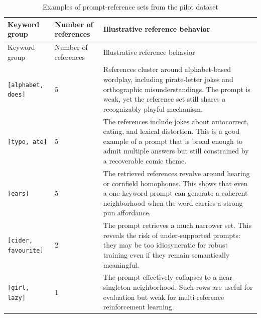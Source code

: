 \documentclass[14pt,a4paper]{extreport}
\begin{document}
\begin{longtable}{p{}p{}p{}}
  \caption{Examples of prompt-reference sets from the pilot dataset}
  \label{tab:examples}                                                                                                                                                                                                                                                       \\
  \toprule
  Keyword group               & Number of references & Illustrative reference behavior                                                                                                                                                                                       \\
  \midrule
  \endfirsthead
  \toprule
  Keyword group               & Number of references & Illustrative reference behavior                                                                                                                                                                                       \\
  \midrule
  \endhead
  \bottomrule
  \endfoot
  \texttt{[alphabet, does]}   & 5                    & References cluster around alphabet-based wordplay, including pirate-letter jokes and orthographic misunderstandings. The prompt is weak, yet the reference set still shares a recognizably playful mechanism.         \\
  \texttt{[typo, ate]}        & 5                    & The references include jokes about autocorrect, eating, and lexical distortion. This is a good example of a prompt that is broad enough to admit multiple answers but still constrained by a recoverable comic theme. \\
  \texttt{[ears]}             & 5                    & The retrieved references revolve around hearing or cornfield homophones. This shows that even a one-keyword prompt can generate a coherent neighborhood when the word carries a strong pun affordance.                \\
  \texttt{[cider, favourite]} & 2                    & The prompt retrieves a much narrower set. This reveals the risk of under-supported prompts: they may be too idiosyncratic for robust training even if they remain semantically meaningful.                            \\
  \texttt{[girl, lazy]}       & 1                    & The prompt effectively collapses to a near-singleton neighborhood. Such rows are useful for evaluation but weak for multi-reference reinforcement learning.                                                           \\
\end{longtable}
\end{document}
